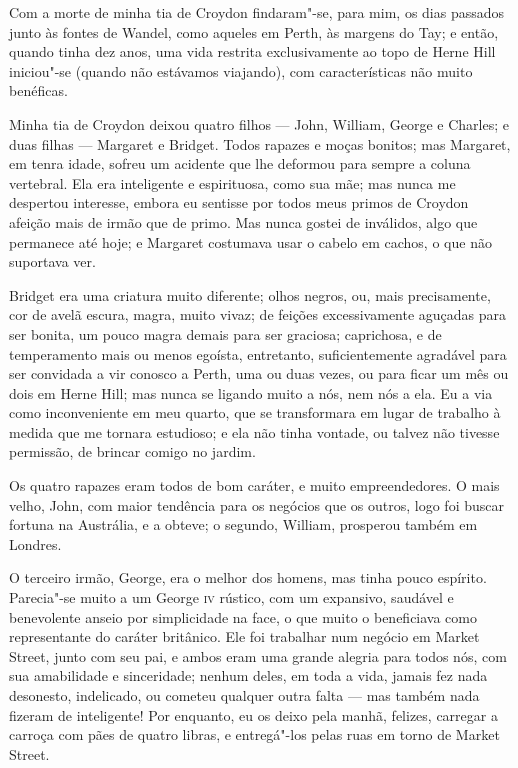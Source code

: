 Com a morte de minha tia de Croydon findaram"-se, para mim, os dias
passados junto às fontes de Wandel, como aqueles em Perth, às margens do
Tay; e então, quando tinha dez anos, uma vida restrita exclusivamente ao
topo de Herne Hill iniciou"-se (quando não estávamos viajando), com
características não muito benéficas.

Minha tia de Croydon deixou quatro filhos --- John, William, George e
Charles; e duas filhas --- Margaret e Bridget. Todos rapazes e moças
bonitos; mas Margaret, em tenra idade, sofreu um acidente que lhe
deformou para sempre a coluna vertebral. Ela era inteligente e
espirituosa, como sua mãe; mas nunca me despertou interesse, embora eu
sentisse por todos meus primos de Croydon afeição mais de irmão que de
primo. Mas nunca gostei de inválidos, algo que permanece até hoje; e
Margaret costumava usar o cabelo em cachos, o que não suportava ver.

Bridget era uma criatura muito diferente; olhos negros, ou, mais
precisamente, cor de avelã escura, magra, muito vivaz; de feições
excessivamente aguçadas para ser bonita, um pouco magra demais para ser
graciosa; caprichosa, e de temperamento mais ou menos egoísta,
entretanto, suficientemente agradável para ser convidada a vir conosco a
Perth, uma ou duas vezes, ou para ficar um mês ou dois em Herne Hill;
mas nunca se ligando muito a nós, nem nós a ela. Eu a via como
inconveniente em meu quarto, que se transformara em lugar de trabalho à
medida que me tornara estudioso; e ela não tinha vontade, ou talvez não
tivesse permissão, de brincar comigo no jardim.

Os quatro rapazes eram todos de bom caráter, e muito empreendedores.
O mais velho, John, com maior tendência para os negócios que os outros,
logo foi buscar fortuna na Austrália, e a obteve; o segundo, William,
prosperou também em Londres.

O terceiro irmão, George, era o melhor dos homens, mas tinha pouco
espírito. Parecia"-se muito a um George \textsc{iv} rústico, com um expansivo,
saudável e benevolente anseio por simplicidade na face, o que muito o
beneficiava como representante do caráter britânico. Ele foi trabalhar
num negócio em Market Street, junto com seu pai, e ambos eram uma grande
alegria para todos nós, com sua amabilidade e sinceridade; nenhum deles,
em toda a vida, jamais fez nada desonesto, indelicado, ou cometeu
qualquer outra falta --- mas também nada fizeram de inteligente! Por
enquanto, eu os deixo pela manhã, felizes, carregar a carroça com pães
de quatro libras, e entregá"-los pelas ruas em torno de Market Street.


